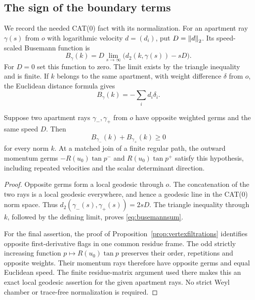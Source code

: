 \subsection{The sign of the boundary terms}
We record the needed CAT(0) fact with its normalization. For an
apartment ray $\gamma(s)$ from $o$ with logarithmic velocity
$d=(d_i)$, put $D=\left\lVert d\right\rVert_2$. Its speed-scaled Busemann function is
\[
 B_\gamma(k)=D\lim_{s\to\infty}
                    \bigl(d_2(k,\gamma(s))-sD\bigr).
\]
For $D=0$ set this function to zero. The limit exists by the
triangle inequality and is finite. If $k$ belongs to the same
apartment, with weight difference $\delta$ from $o$, the
Euclidean distance formula gives
\begin{equation}\label{eq:apartmentbusemann}
 B_\gamma(k)=-\sum_i d_i\delta_i.
\end{equation}

\begin{lemma}\label{lem:oppositebusemann}
Suppose two apartment rays $\gamma_-,\gamma_+$ from $o$ have
opposite weighted germs and the same speed $D$. Then
\begin{equation}\label{eq:busemannsum}
 B_{\gamma_-}(k)+B_{\gamma_+}(k)\ge0
\end{equation}
for every norm $k$. At a matched join of a finite regular path,
the outward momentum germs $-R(u_0)\tan p^-$ and
$R(u_0)\tan p^+$ satisfy this hypothesis, including repeated
velocities and the scalar determinant direction.
\end{lemma}

\begin{proof}
Opposite germs form a local geodesic through $o$. The
concatenation of the two rays is a local geodesic everywhere,
and hence a geodesic line in the CAT(0) norm space.
Thus $d_2(\gamma_-(s),\gamma_+(s))=2sD$.
The triangle inequality through $k$, followed by the defining
limit, proves \eqref{eq:busemannsum}.

For the final assertion, the proof of
Proposition~\ref{prop:vertexfiltrations} identifies opposite
first-derivative flags in one common residue frame.
The odd strictly increasing function $p\mapsto R(u_0)\tan p$
preserves their order, repetitions and opposite weights.
Their momentum rays therefore have opposite germs and equal
Euclidean speed. The finite residue-matrix argument used there
makes this an exact local geodesic assertion for the given
apartment rays. No strict Weyl chamber or trace-free
normalization is required.
\end{proof}

